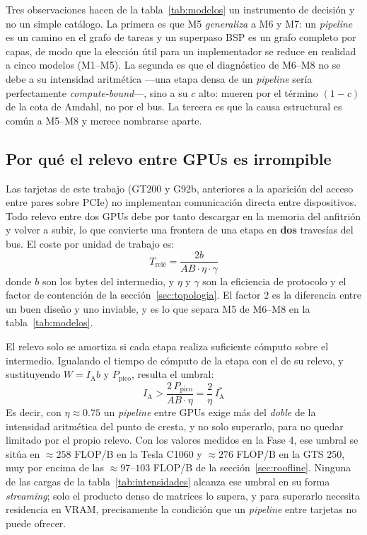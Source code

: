 \documentclass[a4paper,11pt]{article}
\begin{document}
Tres observaciones hacen de la tabla~\ref{tab:modelos} un instrumento de decisión y no un simple catálogo. La primera es que
M5 \emph{generaliza} a M6 y M7: un \textit{pipeline} es un camino en el grafo de tareas y un superpaso BSP es un grafo completo
por capas, de modo que la elección útil para un implementador se reduce en realidad a cinco modelos (M1--M5). La segunda es
que el diagnóstico de M6--M8 no se debe a su intensidad aritmética ---una etapa densa de un \textit{pipeline} sería
perfectamente \emph{compute-bound}---, sino a su $c$ alto: mueren por el término $(1-c)$ de la cota de Amdahl, no por el bus. La
tercera es que la causa estructural es común a M5--M8 y merece nombrarse aparte.

\subsection*{Por qué el relevo entre GPUs es irrompible}

Las tarjetas de este trabajo (GT200 y G92b, anteriores a la aparición del acceso entre pares sobre PCIe) no implementan
comunicación directa entre dispositivos. Todo relevo entre dos GPUs debe por tanto descargar en la memoria del anfitrión y
volver a subir, lo que convierte una frontera de una etapa en \textbf{dos} travesías del bus. El coste por unidad de trabajo es:
\begin{equation}\label{eq:hop}
    T_{\text{relé}} = \frac{2b}{AB \cdot \eta \cdot \gamma}
\end{equation}
donde $b$ son los bytes del intermedio, y $\eta$ y $\gamma$ son la eficiencia de protocolo y el factor de contención de la
sección~\ref{sec:topologia}. El factor $2$ es la diferencia entre un buen diseño y uno inviable, y es lo que separa M5 de M6--M8
en la tabla~\ref{tab:modelos}.

El relevo solo se amortiza si cada etapa realiza suficiente cómputo sobre el intermedio. Igualando el tiempo de cómputo de la
etapa con el de su relevo, y sustituyendo $W = I_{\text{A}} b$ y $P_{\text{pico}}$, resulta el umbral:
\begin{equation}\label{eq:hop_umbral}
    I_{\text{A}} > \frac{2\,P_{\text{pico}}}{AB \cdot \eta} = \frac{2}{\eta}\,I_{\text{A}}^*
\end{equation}
Es decir, con $\eta \approx 0.75$ un \textit{pipeline} entre GPUs exige más del \emph{doble} de la intensidad aritmética del punto
de cresta, y no solo superarlo, para no quedar limitado por el propio relevo. Con los valores medidos en la Fase 4, ese umbral
se sitúa en $\approx 258$ FLOP/B en la Tesla C1060 y $\approx 276$ FLOP/B en la GTS 250, muy por encima de las
$\approx 97$--$103$ FLOP/B de la sección~\ref{sec:roofline}. Ninguna de las cargas de la tabla~\ref{tab:intensidades} alcanza
ese umbral en su forma \textit{streaming}; solo el producto denso de matrices lo supera, y para superarlo necesita residencia en
VRAM, precisamente la condición que un \textit{pipeline} entre tarjetas no puede ofrecer.
\end{document}
